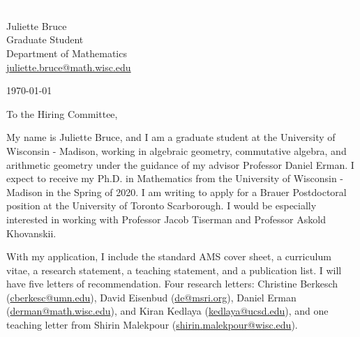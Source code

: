 \documentclass[11pt]{article}
\begin{document}
\section*{}

\noindent
\begin{minipage}{0.99\textwidth}
\begin{minipage}{0.69\textwidth}
\textcolor{white}{.}
\end{minipage}
\begin{minipage}{0.29\textwidth}
{
Juliette Bruce \\
Graduate Student \\
Department of Mathematics \\
\href{mailto:juliette.bruce@math.wisc.edu}{juliette.bruce@math.wisc.edu}
}

\vspace{12pt}
\today
\end{minipage}
\end{minipage}


\vspace{12pt}
\noindent
To the Hiring Committee,

My name is Juliette Bruce, and I am a graduate student at the University of Wisconsin - Madison, working in algebraic geometry, commutative algebra, and arithmetic geometry under the guidance of my advisor Professor Daniel Erman. I expect to receive my Ph.D. in Mathematics from the University of Wisconsin - Madison in the Spring of 2020. I am writing to apply for a Brauer Postdoctoral position at the University of Toronto Scarborough.  I would be especially interested in working with Professor Jacob Tiserman and Professor Askold Khovanskii. 

With my application, I include the standard AMS cover sheet, a curriculum vitae, a research statement, a teaching statement, and a publication list. I will have five letters of recommendation. Four research letters: Christine Berkesch (\href{mailto:cberkesc@umn.edu}{cberkesc@umn.edu}), David Eisenbud (\href{mailto:de@msri.org}{de@msri.org}), Daniel Erman (\href{mailto:derman@math.wisc.edu}{derman@math.wisc.edu}), and Kiran Kedlaya (\href{mailto:kedlaya@ucsb.edu}{kedlaya@ucsd.edu}), and one teaching letter from Shirin Malekpour (\href{mailto:shirin.malekpour@wisc.edu}{shirin.malekpour@wisc.edu}).
\end{document}
